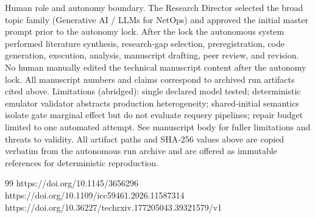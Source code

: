 \documentclass[conference]{IEEEtran}
\begin{document}
Human role and autonomy boundary. The Research Director selected the broad topic family (Generative AI / LLMs for NetOps) and approved the initial master prompt prior to the autonomy lock. After the lock the autonomous system performed literature synthesis, research‑gap selection, preregistration, code generation, execution, analysis, manuscript drafting, peer review, and revision. No human manually edited the technical manuscript content after the autonomy lock. All manuscript numbers and claims correspond to archived run artifacts cited above.
Limitations (abridged): single declared model tested; deterministic emulator validator abstracts production heterogeneity; shared‑initial semantics isolate gate marginal effect but do not evaluate requery pipelines; repair budget limited to one automated attempt. See manuscript body for fuller limitations and threats to validity.
All artifact paths and SHA‑256 values above are copied verbatim from the autonomous run archive and are offered as immutable references for deterministic reproduction.

\begin{thebibliography}{99}
 https://doi.org/10.1145/3656296
 https://doi.org/10.1109/icc59461.2026.11587314
 https://doi.org/10.36227/techrxiv.177205043.39321579/v1
\end{thebibliography}
\end{document}
